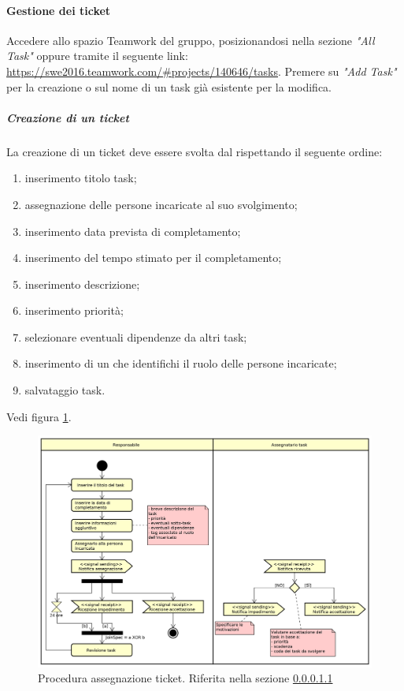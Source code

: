             \paragraph{Gestione dei ticket}\label{sec:procTicket}
            Accedere allo spazio Teamwork del gruppo, posizionandosi nella sezione \textit{"All Task"} oppure tramite il seguente link: \url{https://swe2016.teamwork.com/#projects/140646/tasks}. Premere su \textit{"Add Task"} per la creazione o sul nome di un task già esistente per la modifica.
	            \subparagraph{Creazione di un ticket}\label{sec:creazioneticket}
	                La creazione di un ticket deve essere svolta dal \responsabilediprogetto{} rispettando il seguente ordine:
	                \begin{enumerate}
	                	\item inserimento titolo task;
	                	\item assegnazione delle persone incaricate al suo svolgimento;
	                	\item inserimento data prevista di completamento;
	                	\item inserimento del tempo stimato per il completamento;
	                	\item inserimento descrizione;
	                	\item inserimento priorità;
	                	\item selezionare eventuali dipendenze da altri task;
	                	\item inserimento di un  che identifichi il ruolo delle persone incaricate;
	                	\item salvataggio task.
	                \end{enumerate}
	                Vedi figura \ref{fig:procassticket}.
	    	        \begin{figure}[h!]
	    		        \includegraphics[width=\textwidth]{img/proc_ass_ticket.png}
	    		        \caption{Procedura assegnazione ticket. Riferita nella sezione \ref{sec:creazioneticket}}
	                    \label{fig:procassticket}
	    	        \end{figure}\mbox{}\\
